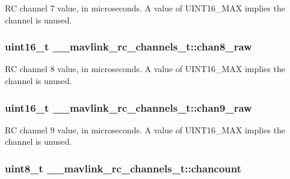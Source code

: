 R\+C channel 7 value, in microseconds. A value of U\+I\+N\+T16\+\_\+\+M\+A\+X implies the channel is unused. 

\hypertarget{struct____mavlink__rc__channels__t_aad00fbc6eac3369961061ca581dd10e3}{
\subsubsection[{chan8\+\_\+raw}]{\setlength{\rightskip}{0pt plus 5cm}uint16\+\_\+t \+\_\+\+\_\+mavlink\+\_\+rc\+\_\+channels\+\_\+t\+::chan8\+\_\+raw}}\label{struct____mavlink__rc__channels__t_aad00fbc6eac3369961061ca581dd10e3}


R\+C channel 8 value, in microseconds. A value of U\+I\+N\+T16\+\_\+\+M\+A\+X implies the channel is unused. 

\hypertarget{struct____mavlink__rc__channels__t_ae57644bb7f8a9e52ecf48fdf845b3d2e}{
\subsubsection[{chan9\+\_\+raw}]{\setlength{\rightskip}{0pt plus 5cm}uint16\+\_\+t \+\_\+\+\_\+mavlink\+\_\+rc\+\_\+channels\+\_\+t\+::chan9\+\_\+raw}}\label{struct____mavlink__rc__channels__t_ae57644bb7f8a9e52ecf48fdf845b3d2e}


R\+C channel 9 value, in microseconds. A value of U\+I\+N\+T16\+\_\+\+M\+A\+X implies the channel is unused. 

\hypertarget{struct____mavlink__rc__channels__t_adccfe2b2c6e7796170de70c82faf38c1}{
\subsubsection[{chancount}]{\setlength{\rightskip}{0pt plus 5cm}uint8\+\_\+t \+\_\+\+\_\+mavlink\+\_\+rc\+\_\+channels\+\_\+t\+::chancount}}\label{struct____mavlink__rc__channels__t_adccfe2b2c6e7796170de70c82faf38c1}


